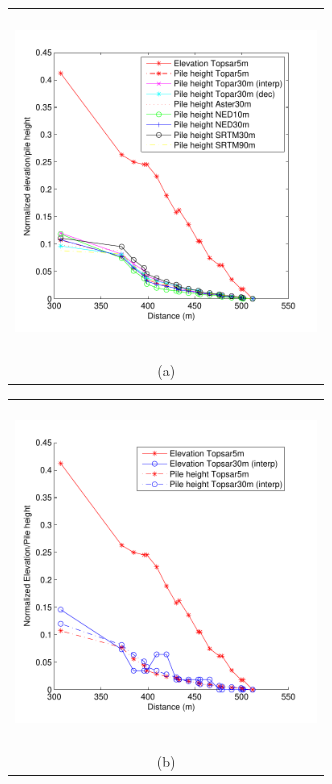 \documentclass[12pt,letterpaper]{article}
\begin{document}
\begin{figure}[H]
  \begin{minipage}[b]{0.5\textwidth}
    \begin{tabular}{c}
      \includegraphics[width=8cm,height=9cm,keepaspectratio]{plots/high_all.pdf}\\
      (a)
    \end{tabular}
  \end{minipage}
  \begin{minipage}{0.5\textwidth}
    \begin{tabular}{c}
      \includegraphics[width=8cm,height=9cm,keepaspectratio]{plots/high_T5_T30.pdf}\\
      (b)
    \end{tabular}
  \end{minipage}
  \begin{minipage}[b]{0.5\textwidth}

\end{minipage}
\end{figure}
\end{document}
